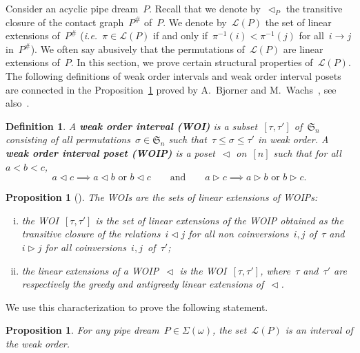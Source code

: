 \documentclass{amsart}
\newtheorem{proposition}[theorem]{Proposition}
\newtheorem{definition}[theorem]{Definition}
\theoremstyle{definition}
\newcommand{\ie}{\textit{i.e.}~} %
\newcommand{\defn}[1]{\textbf{\textsf{\color{PineGreen} #1}}} %
\newcommand{\fS}{\mathfrak{S}} %
\newcommand{\contact}{^\#} %
\newcommand{\acyclicPipeDreams}{\Sigma} %
\newcommand{\linearExtensions}{\mathcal{L}} %
\newcommand{\less}{\vartriangleleft} %
\newcommand{\more}{\vartriangleright} %
\newcommand{\contactLess}[1]{\less_{#1}} %
\begin{document}
Consider an acyclic pipe dream~$P$. Recall that we denote by~$\contactLess{P}$ the transitive closure of the contact graph~$P\contact$ of~$P$. We denote by~$\linearExtensions(P)$ the set of linear extensions of~$P\contact$ (\ie $\pi \in \linearExtensions(P)$ if and only if~$\pi^{-1}(i) < \pi^{-1}(j)$ for all~$i \to j$ in~$P\contact$). We often say abusively that the permutations of~$\linearExtensions(P)$ are linear extensions of~$P$. In this section, we prove certain structural properties of~$\linearExtensions(P)$. The following definitions of weak order intervals and weak order interval posets are connected in the Proposition~\ref{prop:WOIP} proved by A.~Bjorner and M.~Wachs~\cite{BjornerWachs}, see also~\cite{ChatelPilaudPons}.

\begin{definition}
\label{def:WOIP}
A \defn{weak order interval (WOI)} is a subset~$[\tau, \tau']$ of~$\fS_n$ consisting of all permutations~$\sigma \in \fS_n$ such that~$\tau \le \sigma \le \tau'$ in weak order. A \defn{weak order interval poset (WOIP)} is a poset~$\less$ on~$[n]$ such that for all~$a < b < c$,
\[
a \less c \implies a \less b \text{ or } b \less c 
\qquad\text{and}\qquad
a \more c \implies a \more b \text{ or } b \more c.
\]
\end{definition}

\begin{proposition}[]
\label{prop:WOIP}
The WOIs are the sets of linear extensions of WOIPs:
\begin{enumerate}[(i)]
\item the WOI~$[\tau, \tau']$ is the set of linear extensions of the WOIP obtained as the transitive closure of the relations~$i \less j$ for all non coinversions~$i,j$ of~$\tau$ and~$i \more j$ for all coinversions~$i,j$~of~$\tau'$;
\item the linear extensions of a WOIP~$\less$ is the WOI~$[\tau,\tau']$, where~$\tau$ and~$\tau'$ are respectively the greedy and antigreedy linear extensions of~$\less$.
\end{enumerate}
\end{proposition}

We use this characterization to prove the following statement.

\begin{proposition}
\label{prop:intervals}
For any pipe dream~$P \in \acyclicPipeDreams(\omega)$, the set~$\linearExtensions(P)$ is an interval of the weak order.
\end{proposition}
\end{document}
